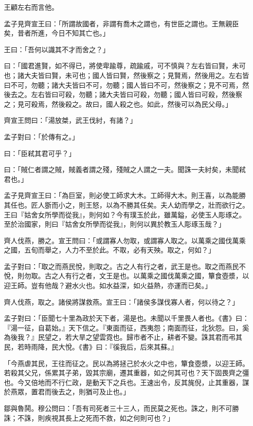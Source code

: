 \begin{pinyinscope}
王顧左右而言他。

孟子見齊宣王曰：「所謂故國者，非謂有喬木之謂也，有世臣之謂也。王無親臣矣，昔者所進，今日不知其亡也。」

王曰：「吾何以識其不才而舍之？」

曰：「國君進賢，如不得已，將使卑踰尊，疏踰戚，可不慎與？左右皆曰賢，未可也；諸大夫皆曰賢，未可也；國人皆曰賢，然後察之；見賢焉，然後用之。左右皆曰不可，勿聽；諸大夫皆曰不可，勿聽；國人皆曰不可，然後察之；見不可焉，然後去之。左右皆曰可殺，勿聽；諸大夫皆曰可殺，勿聽；國人皆曰可殺，然後察之；見可殺焉，然後殺之。故曰，國人殺之也。如此，然後可以為民父母。」

齊宣王問曰：「湯放桀，武王伐紂，有諸？」

孟子對曰：「於傳有之。」

曰：「臣弒其君可乎？」

曰：「賊仁者謂之賊，賊義者謂之殘，殘賊之人謂之一夫。聞誅一夫紂矣，未聞弒君也。」

孟子見齊宣王曰：「為巨室，則必使工師求大木。工師得大木。則王喜，以為能勝其任也。匠人斵而小之，則王怒，以為不勝其任矣。夫人幼而學之，壯而欲行之。王曰『姑舍女所學而從我』，則何如？今有璞玉於此，雖萬鎰，必使玉人彫琢之。至於治國家，則曰『姑舍女所學而從我』，則何以異於教玉人彫琢玉哉？」

齊人伐燕，勝之。宣王問曰：「或謂寡人勿取，或謂寡人取之。以萬乘之國伐萬乘之國，五旬而舉之，人力不至於此。不取，必有天殃。取之，何如？」

孟子對曰：「取之而燕民悅，則取之。古之人有行之者，武王是也。取之而燕民不悅，則勿取。古之人有行之者，文王是也。以萬乘之國伐萬乘之國，簞食壺漿，以迎王師。豈有他哉？避水火也。如水益深，如火益熱，亦運而已矣。」

齊人伐燕，取之。諸侯將謀救燕。宣王曰：「諸侯多謀伐寡人者，何以待之？」

孟子對曰：「臣聞七十里為政於天下者，湯是也。未聞以千里畏人者也。《書》曰：『湯一征，自葛始。』天下信之。『東面而征，西夷怨；南面而征，北狄怨。曰，奚為後我？』民望之，若大旱之望雲霓也。歸市者不止，耕者不變。誅其君而弔其民，若時雨降，民大悅。《書》曰：『徯我后，后來其蘇。』

「今燕虐其民，王往而征之。民以為將拯己於水火之中也，簞食壺漿，以迎王師。若殺其父兄，係累其子弟，毀其宗廟，遷其重器，如之何其可也？天下固畏齊之彊也。今又倍地而不行仁政，是動天下之兵也。王速出令，反其旄倪，止其重器，謀於燕眾，置君而後去之，則猶可及止也。」

鄒與魯鬨。穆公問曰：「吾有司死者三十三人，而民莫之死也。誅之，則不可勝誅；不誅，則疾視其長上之死而不救，如之何則可也？」


\end{pinyinscope}
